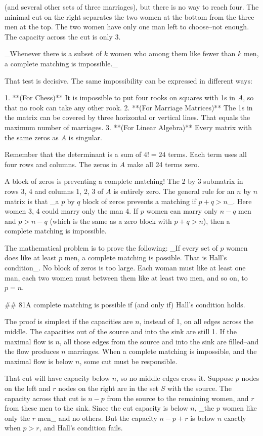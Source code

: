 (and several other sets of three marriages), but there is no way to reach four. The minimal cut on the right separates the two women at the bottom from the three men at the top. The two women have only one man left to choose--not enough. The capacity across the cut is only 3.

_Whenever there is a subset of \(k\) women who among them like fewer than \(k\) men, a complete matching is impossible._

That test is decisive. The same impossibility can be expressed in different ways:

1. **(For Chess)** It is impossible to put four rooks on squares with 1s in \(A\), so that no rook can take any other rook.
2. **(For Marriage Matrices)** The 1s in the matrix can be covered by three horizontal or vertical lines. That equals the maximum number of marriages.
3. **(For Linear Algebra)** Every matrix with the same zeros as \(A\) is singular.

Remember that the determinant is a sum of \(4!=24\) terms. Each term uses all four rows and columns. The zeros in \(A\) make all 24 terms zero.

A block of zeros is preventing a complete matching! The 2 by 3 submatrix in rows 3, 4 and columns 1, 2, 3 of \(A\) is entirely zero. The general rule for an \(n\) by \(n\) matrix is that _a \(p\) by \(q\) block of zeros prevents a matching if \(p+q>n\)_. Here women 3, 4 could marry only the man 4. If \(p\) women can marry only \(n-q\) men and \(p>n-q\) (which is the same as a zero block with \(p+q>n\)), then a complete matching is impossible.

The mathematical problem is to prove the following: _If every set of \(p\) women does like at least \(p\) men, a complete matching is possible. That is Hall's condition_. No block of zeros is too large. Each woman must like at least one man, each two women must between them like at least two men, and so on, to \(p=n\).

## 81A complete matching is possible if (and only if) Hall's condition holds.

The proof is simplest if the capacities are \(n\), instead of 1, on all edges across the middle. The capacities out of the source and into the sink are still 1. If the maximal flow is \(n\), all those edges from the source and into the sink are filled--and the flow produces \(n\) marriages. When a complete matching is impossible, and the maximal flow is below \(n\), some cut must be responsible.

That cut will have capacity below \(n\), so no middle edges cross it. Suppose \(p\) nodes on the left and \(r\) nodes on the right are in the set \(S\) with the source. The capacity across that cut is \(n-p\) from the source to the remaining women, and \(r\) from these men to the sink. Since the cut capacity is below \(n\), _the \(p\) women like only the \(r\) men_ and no others. But the capacity \(n-p+r\) is below \(n\) exactly when \(p>r\), and Hall's condition fails.

 